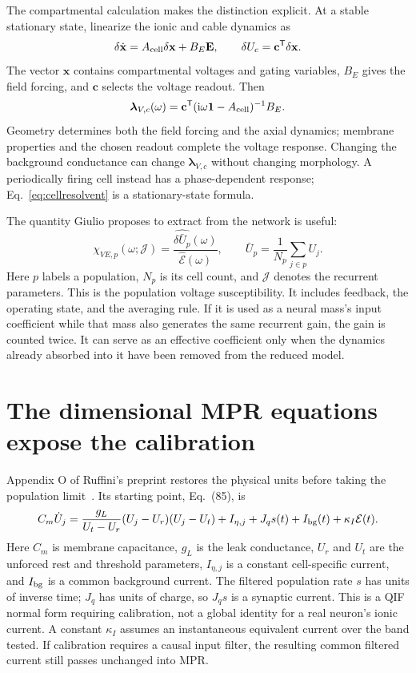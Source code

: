 \documentclass[11pt,a4paper]{article}
\newcommand{\ii}{\mathrm i}
\newcommand{\E}{\mathcal E}
\begin{document}
The compartmental calculation makes the distinction explicit. At a stable stationary state, linearize the ionic and cable dynamics as
\begin{equation}
\delta\dot{\mathbf x}=A_{\rm cell}\delta\mathbf x+B_E\mathbf E,
\qquad
\delta U_c=\mathbf c^{\mathsf T}\delta\mathbf x.
\end{equation}
The vector $\mathbf x$ contains compartmental voltages and gating variables, $B_E$ gives the field forcing, and $\mathbf c$ selects the voltage readout. Then
\begin{equation}
\boldsymbol\lambda_{V,c}(\omega)
=\mathbf c^{\mathsf T}(\ii\omega\mathbf1-A_{\rm cell})^{-1}B_E.
\label{eq:cellresolvent}
\end{equation}
Geometry determines both the field forcing and the axial dynamics; membrane properties and the chosen readout complete the voltage response. Changing the background conductance can change $\boldsymbol\lambda_{V,c}$ without changing morphology. A periodically firing cell instead has a phase-dependent response; Eq.~\eqref{eq:cellresolvent} is a stationary-state formula.

The quantity Giulio proposes to extract from the network is useful:
\begin{equation}
\chi_{VE,p}(\omega;\mathcal J)
=\frac{\widehat{\delta\bar U_p}(\omega)}{\widehat{\E}(\omega)},
\qquad \bar U_p=\frac1{N_p}\sum_{j\in p}U_j.
\label{eq:popchi}
\end{equation}
Here $p$ labels a population, $N_p$ is its cell count, and $\mathcal J$ denotes the recurrent parameters. This is the population voltage susceptibility. It includes feedback, the operating state, and the averaging rule. If it is used as a neural mass's input coefficient while that mass also generates the same recurrent gain, the gain is counted twice. It can serve as an effective coefficient only when the dynamics already absorbed into it have been removed from the reduced model.

\section{The dimensional MPR equations expose the calibration}

Appendix O of Ruffini's preprint restores the physical units before taking the population limit~\cite{ruffini}. Its starting point, Eq.~(85), is
\begin{equation}
C_m\dot U_j=\frac{g_L}{U_t-U_r}(U_j-U_r)(U_j-U_t)
+I_{\eta,j}+J_qs(t)+I_{\rm bg}(t)+\kappa_I\E(t).
\label{eq:qifphysical}
\end{equation}
Here $C_m$ is membrane capacitance, $g_L$ is the leak conductance, $U_r$ and $U_t$ are the unforced rest and threshold parameters, $I_{\eta,j}$ is a constant cell-specific current, and $I_{\rm bg}$ is a common background current. The filtered population rate $s$ has units of inverse time; $J_q$ has units of charge, so $J_qs$ is a synaptic current. This is a QIF normal form requiring calibration, not a global identity for a real neuron's ionic current. A constant $\kappa_I$ assumes an instantaneous equivalent current over the band tested. If calibration requires a causal input filter, the resulting common filtered current still passes unchanged into MPR.
\end{document}
